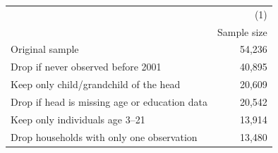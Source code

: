 \begin{center} \begin{threeparttable} \begin{tabular}{l*{1}{r}} \hline \hline
&         (1)   \\
& Sample size   \\
\hline
Original sample & 54,236 \\
Drop if never observed before 2001 & 40,895 \\
Keep only child/grandchild of the head & 20,609 \\
Drop if head is missing age or education data & 20,542 \\
Keep only individuals age 3--21 & 13,914 \\
Drop households with only one observation & 13,480 \\
\hline
\hline \end{tabular} \end{threeparttable} \end{center}
